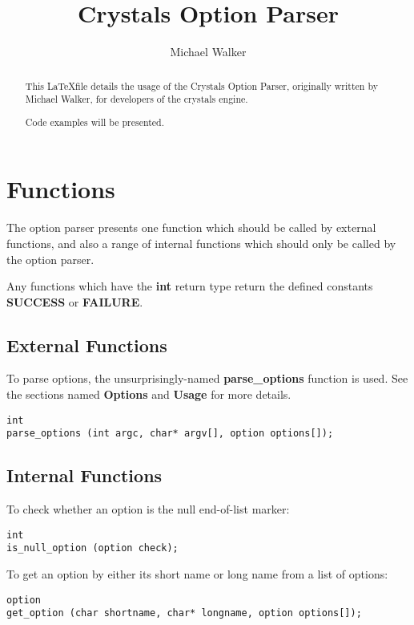 \documentclass[12pt,a4paper]{article}
\author{Michael Walker}
\title{Crystals Option Parser}
\date{}
\begin{document}
\maketitle{}

\begin{abstract}
This \LaTeX file details the usage of the Crystals Option Parser, originally written by Michael Walker, for developers of the crystals engine.

Code examples will be presented.
\end{abstract}

\section{Functions}

The option parser presents one function which should be called by external functions, and also a range of internal functions which should only be called by the option parser.

Any functions which have the \textbf{int} return type return the defined constants \textbf{SUCCESS} or \textbf{FAILURE}.

\subsection{External Functions}

To parse options, the unsurprisingly-named \textbf{parse\_options} function is used. See the sections named \textbf{Options} and \textbf{Usage} for more details.

\begin{lstlisting}
int
parse_options (int argc, char* argv[], option options[]);
\end{lstlisting}

\subsection{Internal Functions}

To check whether an option is the null end-of-list marker:

\begin{lstlisting}
int
is_null_option (option check);
\end{lstlisting}

To get an option by either its short name or long name from a list of options:

\begin{lstlisting}
option
get_option (char shortname, char* longname, option options[]);
\end{lstlisting}
\end{document}
